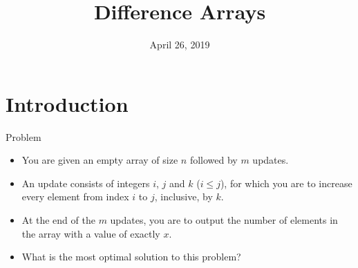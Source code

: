 \documentclass{beamer}
\title[Difference Arrays---Computer Science Club]{\textbf{Difference Arrays}}
\institute{Stephen Lewis Secondary School \\[3ex] {\large Computer Science Club}}
\date{April 26, 2019}
\begin{document}
\begin{frame} 
\titlepage 
\end{frame} 

\section{Introduction}

\begin{frame}{Problem}
\begin{itemize}
    \item You are given an empty array of size $n$ followed by $m$ updates.
    \item An update consists of integers $i$, $j$ and $k$ ($i \leq j$), for which you are to increase every element from index $i$ to $j$, inclusive, by $k$.
    \item At the end of the $m$ updates, you are to output the number of elements in the array with a value of exactly $x$.
    \item What is the most optimal solution to this problem?
\end{itemize}
\end{frame}
\end{document}
